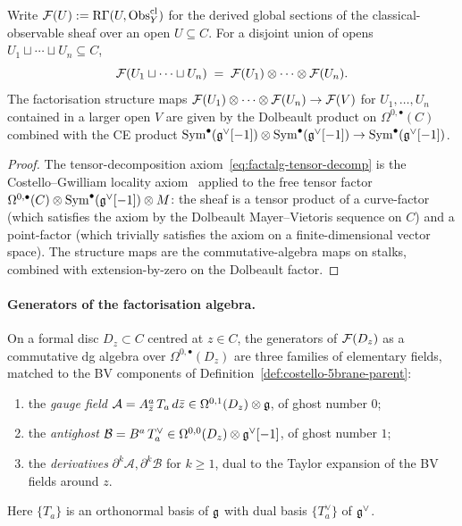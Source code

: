 \begin{proposition}
\label{prop:factalg-on-C-tensor-decomp}
Write $\mathcal F(U) := \mathrm{R}\Gamma(U, \operatorname{Obs}^{\mathrm{cl}}_Y)$ for the
derived global sections of the classical-observable sheaf over an
open $U\subseteq C$. For a disjoint union of opens
$U_1\sqcup\cdots\sqcup U_n \subseteq C$,
\begin{equation}
\label{eq:factalg-tensor-decomp}
\mathcal F(U_1\sqcup\cdots\sqcup U_n)
\;=\;
\mathcal F(U_1)\otimes\cdots\otimes\mathcal F(U_n).
\end{equation}
The factorisation structure maps $\mathcal F(U_1)\otimes\cdots\otimes\mathcal F(U_n)
\to \mathcal F(V)$ for $U_1,\dots,U_n$ contained in a larger open $V$ are
given by the Dolbeault product on $\Omega^{0,\bullet}(C)$ combined
with the CE product $\operatorname{Sym}^\bullet(\mathfrak g^\vee[-1])\otimes
\operatorname{Sym}^\bullet(\mathfrak g^\vee[-1])\to\operatorname{Sym}^\bullet(\mathfrak g^\vee[-1])$.
\end{proposition}

\begin{proof}[Proof]
The tensor-decomposition axiom~\eqref{eq:factalg-tensor-decomp} is the
Costello--Gwilliam locality axiom~\cite[\S3.1]{CG17} applied to the
free tensor factor $\Omega^{0,\bullet}(C)\otimes
\operatorname{Sym}^\bullet(\mathfrak g^\vee[-1])\otimes M$: the sheaf is a tensor product of
a curve-factor (which satisfies the axiom by the Dolbeault Mayer--Vietoris
sequence on $C$) and a point-factor (which trivially satisfies the axiom
on a finite-dimensional vector space). The structure maps are the
commutative-algebra maps on stalks, combined with extension-by-zero on
the Dolbeault factor.
\end{proof}

\paragraph{Generators of the factorisation algebra.}
On a formal disc $D_z\subset C$ centred at $z\in C$, the generators of
$\mathcal F(D_z)$ as a commutative dg algebra over
$\Omega^{0,\bullet}(D_z)$ are three families of elementary fields,
matched to the BV components of
Definition~\ref{def:costello-5brane-parent}:
\begin{enumerate}[label=\textup{(G\arabic*)},ref=G\arabic*]
\item\label{gen:G1} the \emph{gauge field}
$\mathcal A = A^a_{\bar z}\,T_a\,d\bar z \in \Omega^{0,1}(D_z)\otimes\mathfrak g$,
of ghost number $0$;
\item\label{gen:G2} the \emph{antighost}
$\mathcal B = B^a\,T_a^\vee \in \Omega^{0,0}(D_z)\otimes\mathfrak g^\vee[-1]$,
of ghost number $1$;
\item\label{gen:G3} the \emph{derivatives}
$\partial^k \mathcal A, \partial^k \mathcal B$ for $k\geq 1$, dual to
the Taylor expansion of the BV fields around $z$.
\end{enumerate}
Here $\{T_a\}$ is an orthonormal basis of $\mathfrak g$ with dual basis
$\{T_a^\vee\}$ of $\mathfrak g^\vee$.


